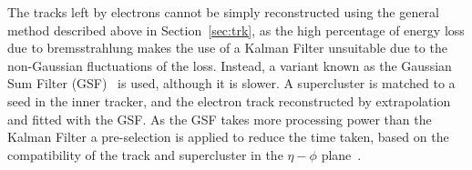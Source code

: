 The tracks left by electrons cannot be simply reconstructed using the general method described above in Section~\ref{sec:trk}, as the high percentage of energy loss due to bremsstrahlung makes the use of a Kalman Filter unsuitable due to the non-Gaussian fluctuations of the loss. Instead, a variant known as the Gaussian Sum Filter (GSF)~\cite{gsf} is used, although it is slower. A supercluster is matched to a seed in the inner tracker, and the electron track reconstructed by extrapolation and fitted with the GSF.  As the GSF takes more processing power than the Kalman Filter a pre-selection is applied to reduce the time taken, based on the compatibility of the track and supercluster in the $\eta - \phi$ plane~\cite{EGM-10-004}.



